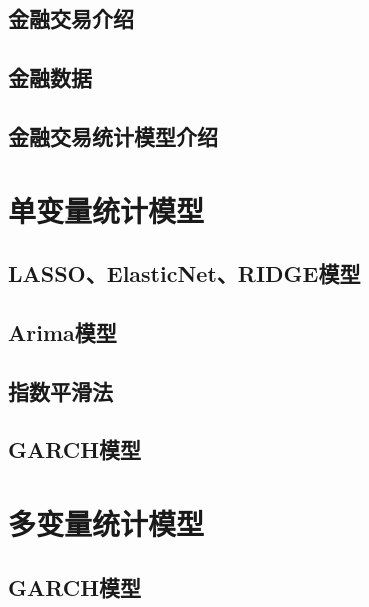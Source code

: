 \documentclass[]{book}
\theoremstyle{definition}
\theoremstyle{definition}
\theoremstyle{definition}
\theoremstyle{remark}
\begin{document}
\subsection{金融交易介绍}

\subsection{金融数据}

\subsection{金融交易统计模型介绍}

\section{单变量统计模型}

\hypertarget{lassoelasticnetridge}{%
\subsection{LASSO、ElasticNet、RIDGE模型}\label{lassoelasticnetridge}}

\hypertarget{arima}{%
\subsection{Arima模型}\label{arima}}

\subsection{指数平滑法}

\hypertarget{garch}{%
\subsection{GARCH模型}\label{garch}}

\section{多变量统计模型}

\hypertarget{garch-1}{%
\subsection{GARCH模型}\label{garch-1}}

\hypertarget{section}{%
\subsection{}\label{section}}
\end{document}

